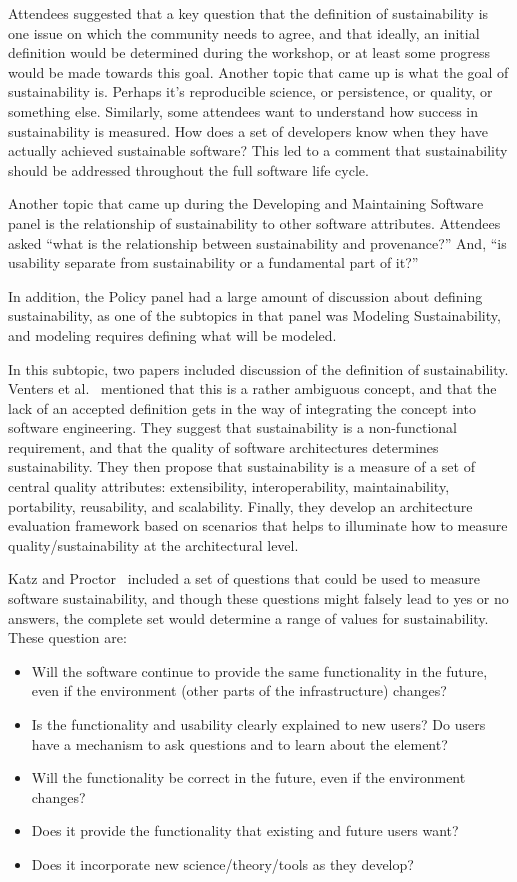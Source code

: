 \documentclass[11pt, oneside]{amsart}
\begin{document}
Attendees suggested that a key question that the definition of sustainability is
one issue on which the community needs to agree, and that ideally, an initial
definition would be determined during the workshop, or at least some progress
would be made towards this goal.  Another topic that came up is what the
goal of sustainability is.  Perhaps it's reproducible science, or
persistence, or quality, or something else.  Similarly, some attendees want
to understand how success in sustainability is measured.  How does a set of
developers know when they have actually achieved sustainable software?
This led to a comment that sustainability should be addressed throughout the
full software life cycle.

Another topic that came up during the Developing and Maintaining Software
panel is the relationship of sustainability to other software attributes.  Attendees
asked ``what is the relationship between sustainability and provenance?'' And,
``is usability separate from sustainability or a fundamental part of it?''

In addition, the Policy panel had a large amount of discussion about
defining sustainability, as one of the subtopics in that panel was
Modeling Sustainability, and modeling requires defining what will be modeled.

In this subtopic, two papers included discussion of the definition of
sustainability.  Venters et al.~\cite{Venters_WSSSPE} mentioned
that this is a rather ambiguous concept, and that the lack of an accepted
definition gets in the way of integrating the concept into software engineering.
They suggest that sustainability is a non-functional requirement, and that the
quality of software architectures determines sustainability.  They then
propose that sustainability is a measure of a set of central quality attributes:
extensibility, interoperability, maintainability, portability, reusability, and scalability.
Finally, they develop an architecture evaluation framework based on scenarios
that helps to illuminate how to measure quality/sustainability at
the architectural level.

Katz and Proctor~\cite{Katz_WSSSPE} included a set of questions that could
be used to measure software sustainability, and though these questions might falsely lead
to yes or no answers, the complete set would determine a range of values for
sustainability. These question are:
\begin{itemize}
\item Will the software continue to provide the same functionality in the future, even if the environment (other parts of the infrastructure) changes?
\item Is the functionality and usability clearly explained to new users? Do users have a mechanism to ask questions and to learn about the element?
\item Will the functionality be correct in the future, even if the environment changes?
\item Does it provide the functionality that existing and future users want?
\item Does it incorporate new science/theory/tools as they develop?
\end{itemize}
\end{document}

